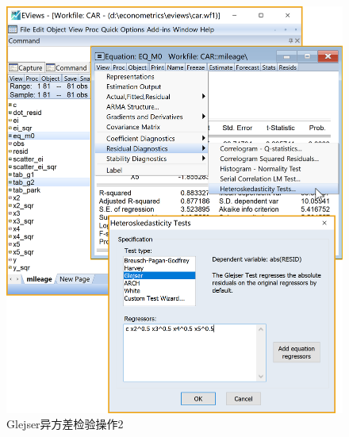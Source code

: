 \documentclass[12pt,(landscape,a4paper),(portrait,a4paper)]{article}
\begin{document}
\begin{figure}

{\centering \includegraphics[width=24.14in]{picture/lab6-heteroskedasticity/4-test-G2-1} 

}

\caption{Glejser异方差检验操作2}\label{fig:fig-G2-test}
\end{figure}
\end{document}
